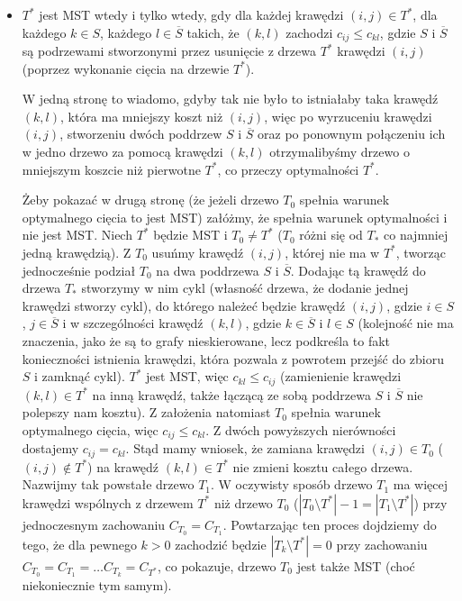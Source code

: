 \begin{itemize}
	\item $T^{\ast}$ jest MST wtedy i tylko wtedy, gdy dla każdej krawędzi $\left( i, j \right) \in T^{\ast}$, dla każdego $k \in S$, każdego $l \in \overline{S}$ takich, że $\left( k, l \right)$ zachodzi $c_{ij} \leqslant c_{kl}$, gdzie $S$ i $\overline{S}$ są podrzewami stworzonymi przez usunięcie z drzewa $T^{\ast}$ krawędzi $\left( i, j \right)$ (poprzez wykonanie cięcia na drzewie $T^{\ast}$).
	
	W jedną stronę to wiadomo, gdyby tak nie było to istniałaby taka krawędź $\left( k, l \right)$, która ma mniejszy koszt niż $\left( i, j \right)$, więc po wyrzuceniu krawędzi $\left( i, j \right)$, stworzeniu dwóch poddrzew $S$ i $\overline{S}$ oraz po ponownym połączeniu ich w jedno drzewo za pomocą krawędzi $\left( k, l \right)$ otrzymalibyśmy drzewo o mniejszym koszcie niż pierwotne $T^{\ast}$, co przeczy optymalności $T^{\ast}$.
	
	Żeby pokazać w drugą stronę (że jeżeli drzewo $T_{0}$ spełnia warunek optymalnego cięcia to jest MST) załóżmy, że spełnia warunek optymalności i nie jest MST. Niech $T^{\ast}$ będzie MST i $T_{0} \neq T^{\ast}$ ($T_{0}$ różni się od $T_{\ast}$ co najmniej jedną krawędzią). Z $T_{0}$ usuńmy krawędź $\left( i, j \right)$, której nie ma w $T^{\ast}$, tworząc jednocześnie podział $T_{0}$ na dwa poddrzewa $S$ i $\overline{S}$. Dodając tą krawędź do drzewa $T_{\ast}$ stworzymy w nim cykl (własność drzewa, że dodanie jednej krawędzi stworzy cykl), do którego należeć będzie krawędź $\left( i, j \right)$, gdzie $i \in S$, $j \in \overline{S}$ i w szczególności krawędź $\left( k, l \right)$, gdzie $k \in \overline{S}$ i $l \in S$ (kolejność nie ma znaczenia, jako że są to grafy nieskierowane, lecz podkreśla to fakt konieczności istnienia krawędzi, która pozwala z powrotem przejść do zbioru $S$ i zamknąć cykl). $T^{\ast}$ jest MST, więc $c_{kl} \leqslant c_{ij}$ (zamienienie krawędzi $\left( k, l \right) \in T^{\ast}$ na inną krawędź, także łączącą ze sobą poddrzewa $S$ i $\overline{S}$ nie polepszy nam kosztu). Z założenia natomiast $T_{0}$ spełnia warunek optymalnego cięcia, więc $c_{ij} \leqslant c_{kl}$. Z dwóch powyższych nierówności dostajemy $c_{ij} = c_{kl}$. Stąd mamy wniosek, że zamiana krawędzi $\left( i, j \right) \in T_{0}$ ($\left( i, j \right) \notin T^{\ast}$) na krawędź $\left( k, l \right) \in T^{\ast}$ nie zmieni kosztu całego drzewa. Nazwijmy tak powstałe drzewo $T_{1}$. W oczywisty sposób drzewo $T_{1}$ ma więcej krawędzi wspólnych z drzewem $T^{\ast}$ niż drzewo $T_{0}$ ($\left| T_{0} \setminus T^{\ast} \right| - 1 = \left| T_{1} \setminus T^{\ast} \right|$) przy jednoczesnym zachowaniu $C_{T_{0}} = C_{T_{1}}$. Powtarzając ten proces dojdziemy do tego, że dla pewnego $k > 0$ zachodzić będzie $\left| T_{k} \setminus T^{\ast} \right| = 0$ przy zachowaniu $C_{T_{0}} = C_{T_{1}} = \dots C_{T_{k}} = C_{T^{\ast}}$, co pokazuje, drzewo $T_{0}$ jest także MST (choć niekoniecznie tym samym).
	

\end{itemize}
